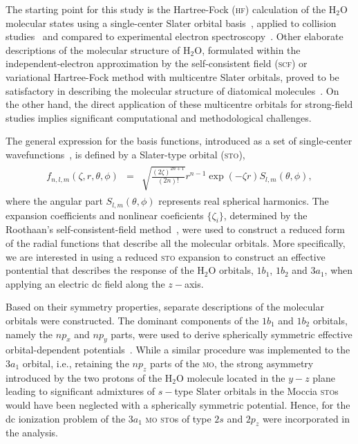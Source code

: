 The starting point for this study is the Hartree-Fock (\textsc{hf})
calculation of the H$_{2}$O molecular states using a single-center
Slater orbital
basis~\cite{Moccia_1964,Moccia_JCP_2164,Moccia_JCP_2176}, applied to
collision studies~\cite{Montanari_2013} and compared to experimental
electron spectroscopy~\cite{Hafied_2007}. Other elaborate descriptions
of the molecular structure of H$_{2}$O, formulated within the
independent-electron approximation by the self-consistent field
(\textsc{scf}) or variational Hartree-Fock method with multicentre
Slater orbitals, proved to be satisfactory in describing the molecular
structure of diatomical molecules~\cite{Pitzer_1968}. On the other
hand, the direct application of these multicentre orbitals for
strong-field studies implies significant computational and
methodological challenges.

The general expression for the basis functions, introduced as a set of
single-center
wavefunctions~\cite{Moccia_1964,Moccia_JCP_2164,Moccia_JCP_2176}, is
defined by a Slater-type orbital (\textsc{sto}),
%
\begin{eqnarray}
  \begin{split}
 f_{n, l, m}(\zeta,r,\theta,\phi) & = & \sqrt{\frac{(2\zeta)^{2n+1}}{(2n)!}}
 r^{n-1} \exp(-\zeta r) S_{l, m}(\theta,\phi),
 \end{split}
\label{eq:sto}
\end{eqnarray}
%
where the angular part $S_{l,m}(\theta,\phi)$ represents real
spherical harmonics. The expansion coefficients and nonlinear
coeficients $\{\zeta_{i}\}$, determined by the Roothaan's
self-consistent-field method~\cite{Moccia_1964,Roothaan_1951}, were
used to construct a reduced form of the radial functions that describe
all the molecular orbitals. More specifically, we are interested in
using a reduced \textsc{sto} expansion to construct an effective
pontential that describes the response of the H$_{2}$O orbitals,
$1b_{1}$, $1b_{2}$ and $3a_{1}$, when applying an electric dc field
along the $z-$axis.

Based on their symmetry properties, separate descriptions of the
molecular orbitals were constructed. The dominant components of the
$1b_{1}$ and $1b_{2}$ orbitals, namely the $np_{x}$ and $np_{y}$
parts, were used to derive spherically symmetric effective
orbital-dependent potentials~\cite{sarias_2016}. While a similar
procedure was implemented to the $3a_{1}$ orbital, i.e., retaining the
$np_{z}$ parts of the \textsc{mo}, the strong asymmetry introduced by
the two protons of the H$_{2}$O molecule located in the $y-z$ plane
leading to significant admixtures of $s-$type Slater orbitals in the
Moccia \textsc{sto}s~\cite{Moccia_1964} would have been neglected with
a spherically symmetric potential. Hence, for the dc ionization
problem of the $3a_{1}$ \textsc{mo} \textsc{sto}s of type $2s$ and
$2p_{z}$ were incorporated in the analysis.



